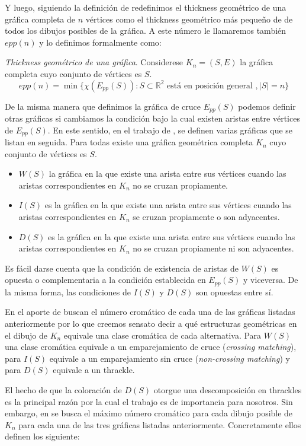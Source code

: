Y luego, siguiendo la definición de \cite{Dillencourt2004} redefinimos el thickness
geométrico de una gráfica completa de $n$ vértices como el thickness geométrico
más pequeño de de todos los dibujos posibles de la gráfica.
A este número le llamaremos también $epp(n)$ y lo definimos formalmente como:
\begin{definition}{\emph{Thickness geométrico de una gráfica}.}
  Considerese $K_n=(S,E)$ la gráfica completa cuyo conjunto de vértices es $S$.
  \[epp(n) = \min\{ \chi(E_{pp}(S)): S \subset \mathbb{R}^2 \text{ está en posición general }, |S|=n \}\]
\end{definition}

De la misma manera que definimos la gráfica de cruce $E_{pp}(S)$ podemos definir
otras gráficas si cambiamos la condición bajo la cual existen aristas entre vértices
de $E_{pp}(S)$. En este sentido, en el trabajo de \cite{Araujo2005}, se definen
varias gráficas que se listan en seguida. Para todas existe una gráfica geométrica
completa $K_n$ cuyo conjunto de vértices es $S$.
\begin{itemize}
  \item $W(S)$ la gráfica en la que existe una arista entre sus vértices
  cuando las aristas correspondientes en $K_n$ no se cruzan propiamente.
  \item $I(S)$ es la gráfica en la que existe una arista entre sus vértices
  cuando las aristas correspondientes en $K_n$ se cruzan propiamente o son adyacentes.
  \item $D(S)$ es la gráfica en la que existe una arista entre sus vértices
  cuando las aristas correspondientes en $K_n$ no se cruzan propiamente ni son adyacentes.
\end{itemize}

Es fácil darse cuenta que la condición de existencia de aristas de $W(S)$ es opuesta
o complementaria a la condición establecida en $E_{pp}(S)$ y viceversa. De la misma
forma, las condiciones de $I(S)$ y $D(S)$ son opuestas entre sí.

En el aporte de \cite{Araujo2005} buscan el número cromático de cada una de las
gráficas listadas anteriormente por lo que creemos sensato decir a qué estructuras
geométricas en el dibujo de $K_n$ equivale una clase cromática de cada alternativa.
Para $W(S)$ una clase cromática equivale a un emparejamiento de cruce (\emph{crossing matching}),
para $I(S)$ equivale a un emparejamiento sin cruce (\emph{non-crossing matching})
y para $D(S)$ equivale a un thrackle.

El hecho de que la coloración de $D(S)$ otorgue una descomposición en thrackles es la
principal razón por la cual el trabajo es de importancia para nosotros. Sin embargo,
en \cite{Araujo2005} se busca el máximo número cromático para cada dibujo posible
de $K_n$ para cada una de las tres gráficas listadas anteriormente. Concretamente
ellos definen los siguiente:

